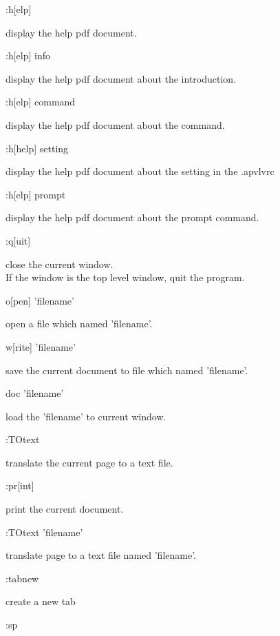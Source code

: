 \documentclass[a4paper,12pt]{article}
\begin{document}
\begin{description}

\item :h[elp]

display the help pdf document.

\item :h[elp] info

display the help pdf document about the introduction.

\item :h[elp] command

display the help pdf document about the command.

\item :h[help] setting

display the help pdf document about the setting in the .apvlvrc

\item :h[elp] prompt

display the help pdf document about the prompt command.

\item :q[uit]

close the current window.\\
If the window is the top level window, quit the program.

\item o[pen] 'filename'

open a file which named 'filename'.

\item w[rite] 'filename'

save the current document to file which named 'filename'.

\item doc 'filename'

load the 'filename' to current window.

\item :TOtext

translate the current page to a text file.

\item :pr[int]

print the current document.

\item :TOtext 'filename'

translate page to a text file named 'filename'.

\item :tabnew

create a new tab

\item :sp


\end{description}
\end{document}
